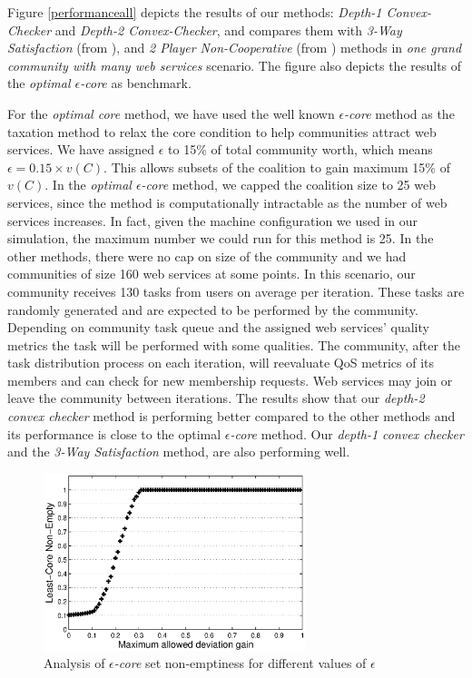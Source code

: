 \documentclass[10pt,journal,cspaper,compsoc]{IEEEtran}
\begin{document}
Figure \ref{performanceall} depicts the results of our methods:
\emph{Depth-1 Convex-Checker} and \emph{Depth-2 Convex-Checker},
and compares them with \emph{3-Way Satisfaction} (from
\cite{DBLP:conf/IEEEscc/LimTMB12}), and \emph{2 Player
Non-Cooperative} (from \cite{DBLP:conf/IEEEscc/KhosravifarABT11})
methods in \emph{one grand community with many web services}
scenario. The figure also depicts the results of the \emph{optimal
$\epsilon$-core} as benchmark.


For the \emph{optimal core} method, we have used the well known
\emph{$\epsilon$-core} method as the taxation method to relax the
core condition to help communities attract web services. We have
assigned $\epsilon$ to 15\% of total community worth, which means
$\epsilon = 0.15 \times v(C)$. This allows subsets of the
coalition to gain maximum 15\% of $v(C)$. In the \emph{optimal
$\epsilon$-core} method, we capped the coalition size to 25 web
services, since the method is computationally intractable as the
number of web services increases. In fact, given the machine
configuration we used in our simulation, the maximum number we
could run for this method is 25. In the other methods, there were
no cap on size of the community and we had communities of size 160
web services at some points. In this scenario, our community
receives 130 tasks from users on average per iteration. These tasks are randomly generated and are expected to be performed by the community. Depending on community task queue and the assigned web services' quality metrics the task will be performed with some qualities.
The community, after the task distribution process on each iteration,
will reevaluate QoS metrics of its members and can check for new
membership requests. Web services may join or leave the community
between iterations. The results show that our \emph{depth-2 convex
checker} method is performing better compared to the other methods
and its performance is close to the optimal \emph{$\epsilon$-core}
method. Our \emph{depth-1 convex checker} and the \emph{3-Way
Satisfaction} method, are also performing well.


\begin{figure}[!t]
\centering
\includegraphics[width=3in]{least_core.eps}
\caption{Analysis of \emph{$\epsilon$-core} set non-emptiness for
different values of $\epsilon$} \label{f_leastcore}
\end{figure}
\end{document}

